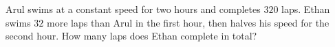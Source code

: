 Arul swims at a constant speed for two hours and completes $320$ laps. Ethan swims $32$ more laps than Arul in the first hour, then halves his speed for the second hour. How many laps does Ethan complete in total?
